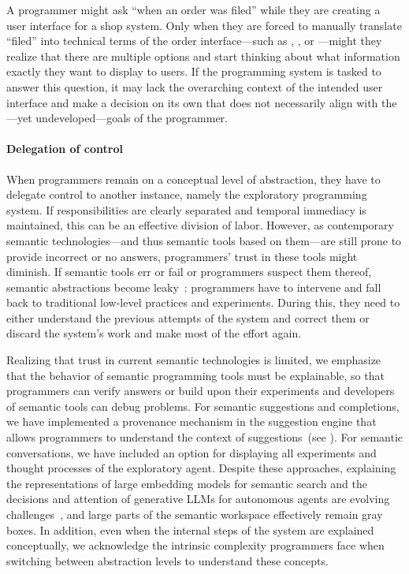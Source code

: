 \begin{example}
	A programmer might ask ``when an order was filed'' while they are creating a user interface for a shop system.
	Only when they are forced to manually translate ``filed'' into technical terms of the order interface---such as , , or ---might they realize that there are multiple options and start thinking about what information exactly they want to display to users.
	If the programming system is tasked to answer this question, it may lack the overarching context of the intended user interface and make a decision on its own that does not necessarily align with the---yet undeveloped---goals of the programmer.
\end{example}

\paragraph{Delegation of control}
\label{par:discussion/experience/process/delegation}

When programmers remain on a conceptual level of abstraction, they have to delegate control to another instance, namely the exploratory programming system.
If responsibilities are clearly separated and temporal immediacy is maintained, this can be an effective division of labor.
However, as contemporary semantic technologies---and thus semantic tools based on them---are still prone to provide incorrect or no answers, programmers' trust in these tools might diminish.
If semantic tools err or fail or programmers suspect them thereof, semantic abstractions become leaky~\cite[chap. 26]{spolsky2004joel}: programmers have to intervene and fall back to traditional low-level practices and experiments.
During this, they need to either understand the previous attempts of the system and correct them or discard the system's work and make most of the effort again.

Realizing that trust in current semantic technologies is limited, we emphasize that the behavior of semantic programming tools must be explainable, so that programmers can verify answers or build upon their experiments and developers of semantic tools can debug problems.
For semantic suggestions and completions, we have implemented a provenance mechanism in the suggestion engine that allows programmers to understand the context of suggestions~(see ).
For semantic conversations, we have included an option for displaying all experiments and thought processes of the exploratory agent.
Despite these approaches, explaining the representations of large embedding models for semantic search and the decisions and attention of generative LLMs for autonomous agents are evolving challenges~\cites{chefer2021generic}[sec.~8.1.3]{zhao2023survey}, and large parts of the semantic workspace effectively remain gray boxes.
In addition, even when the internal steps of the system are explained conceptually, we acknowledge the intrinsic complexity programmers face when switching between abstraction levels to understand these concepts.

